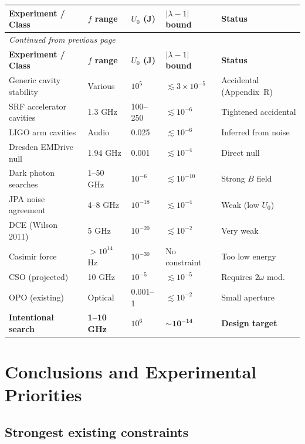 \documentclass[12pt,letterpaper]{article}
\begin{document}
\begin{longtable}{p{4.5cm}p{2cm}p{2cm}p{2.5cm}p{3cm}}
\toprule
\textbf{Experiment / Class} & \textbf{$f$ range} & \textbf{$U_0$ (J)} &
  \textbf{$|\lambda-1|$ bound} & \textbf{Status} \\
\midrule
\endfirsthead
\multicolumn{5}{l}{\textit{Continued from previous page}} \\
\toprule
\textbf{Experiment / Class} & \textbf{$f$ range} & \textbf{$U_0$ (J)} &
  \textbf{$|\lambda-1|$ bound} & \textbf{Status} \\
\midrule
\endhead
Generic cavity stability & Various & $10^5$ &
  $\lesssim 3\times 10^{-5}$ & Accidental (Appendix~R) \\
SRF accelerator cavities & 1.3 GHz & 100--250 &
  $\lesssim 10^{-6}$ & Tightened accidental \\
LIGO arm cavities & Audio & 0.025 &
  $\lesssim 10^{-6}$ & Inferred from noise \\
Dresden EMDrive null & 1.94 GHz & 0.001 &
  $\lesssim 10^{-4}$ & Direct null \\
Dark photon searches & 1--50 GHz & $10^{-6}$ &
  $\lesssim 10^{-10}$ & Strong $B$ field \\
JPA noise agreement & 4--8 GHz & $10^{-18}$ &
  $\lesssim 10^{-4}$ & Weak (low $U_0$) \\
DCE (Wilson 2011) & 5 GHz & $10^{-20}$ &
  $\lesssim 10^{-2}$ & Very weak \\
Casimir force & $> 10^{14}$ Hz & $10^{-30}$ &
  No constraint & Too low energy \\
CSO (projected) & 10 GHz & $10^{-5}$ &
  $\lesssim 10^{-5}$ & Requires $2\omega$ mod. \\
OPO (existing) & Optical & 0.001--1 &
  $\lesssim 10^{-2}$ & Small aperture \\
\midrule
\textbf{Intentional search} & \textbf{1--10 GHz} & \textbf{$10^6$} &
  $\mathbf{\sim 10^{-14}}$ & \textbf{Design target} \\
\bottomrule
\end{longtable}

\section{Conclusions and Experimental Priorities}

\subsection{Strongest existing constraints}
\end{document}
